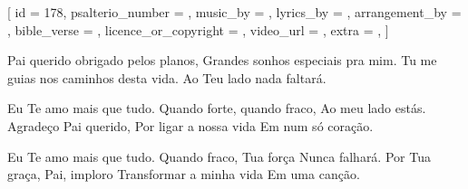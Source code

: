 [
    id                     = {178},
    psalterio_number       = {},
    music_by               = {},
    lyrics_by              = {},
    arrangement_by         = {},
    bible_verse            = {},
    licence_or_copyright   = {},
    video_url              = {},
    extra                  = {},
]


\beginchorus
Pai querido obrigado pelos planos, 
Grandes sonhos especiais pra mim. 
Tu me guias nos caminhos desta vida. 
Ao Teu lado nada faltará. 
\endchorus


\beginverse
Eu Te amo mais que tudo. 
Quando forte, quando fraco, 
Ao meu lado estás. 
Agradeço Pai querido, 
Por ligar a nossa vida 
Em num só coração. 
\endverse



\beginverse
Eu Te amo mais que tudo. 
Quando fraco, Tua força 
Nunca falhará. 
Por Tua graça, Pai, imploro 
Transformar a minha vida 
Em uma canção.
\endverse



\endsong
